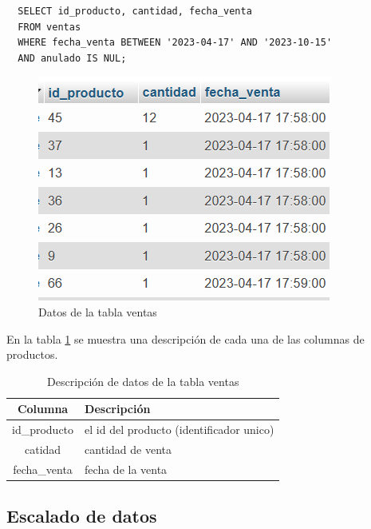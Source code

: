 \begin{verbatim}
  SELECT id_producto, cantidad, fecha_venta
  FROM ventas
  WHERE fecha_venta BETWEEN '2023-04-17' AND '2023-10-15'
  AND anulado IS NUL;
\end{verbatim}
\begin{figure}[H]
  \begin{center}
    \includegraphics[scale=0.90]{./ventas_fecha.png}
    \caption{Datos de la tabla ventas}
    \label{fig:fecha_venta}
  \end{center}
\end{figure}

En la tabla \ref{tab:ventas_fechas} se muestra una descripción de cada una de
las columnas de productos.

\begin{table}[H]

  \begin{tabular}{|c|l|}  %
    \hline
    \rowcolor{gray!50} \textbf{Columna} & \textbf{Descripción}                     \\
    \hline
    id\_producto                        & el id del producto (identificador unico) \\
    catidad                             & cantidad de venta                        \\
    fecha\_venta                        & fecha de la venta                        \\
    \hline
  \end{tabular}
  \centering
  \caption{ Descripción de datos de la tabla ventas}
  \label{tab:ventas_fechas} %
\end{table}


\subsection{Escalado de datos}

